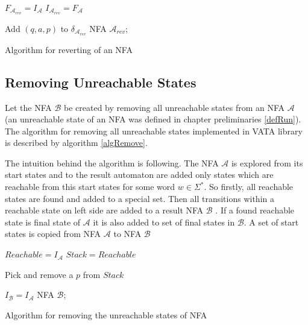 \begin{algorithm}[H]
	\label{algRev}

  
  $F_{\mathcal{A}_{rev}}=I_\mathcal{A}$\; 
  $I_{\mathcal{A}_{rev}}=F_\mathcal{A}$\;

   {
    Add $(q,a,p)$ to $\delta_{\mathcal{A}_{rev}}$\;
  }
	\Return NFA $\mathcal{A}_{rev}$;
	\caption{Algorithm for reverting of an NFA}
\end{algorithm}

\subsection{Removing Unreachable States}
Let the NFA $\mathcal{B}$ be created by removing all unreachable states from an NFA $\mathcal{A}$ (an unreachable state of an NFA was defined in
chapter preliminaries \ref{defRun}). The algorithm for removing all unreachable states implemented in VATA library is described by algorithm \ref{algRemove}.

The intuition behind the algorithm is following. The NFA $\mathcal{A}$ is explored from its start states and to the result automaton 
are added only states which are
reachable from this start states for some word $w \in \Sigma^{*}$. So firstly, all reachable states are found and added to a special set. 
Then all transitions within a reachable state on left side are added to a result NFA $\mathcal{B}$ .
If a found reachable state is final state of 
$\mathcal{A}$ it is also added to set of final states in $\mathcal{B}$. A set of start states is copied from
NFA $\mathcal{A}$ to NFA $\mathcal{B}$
\\

\begin{algorithm}[H]
	\label{algRemove}

  $Reachable = I_\mathcal{A}$\;
  $Stack = Reachable$\;
	
   {
			Pick and remove a $p$ from $Stack$\;
	 }

  $I_{\mathcal{B}} = I_{\mathcal{A}}$\;
		\Return NFA $\mathcal{B}$;
	\caption{Algorithm for removing the unreachable states of NFA}
\end{algorithm}

